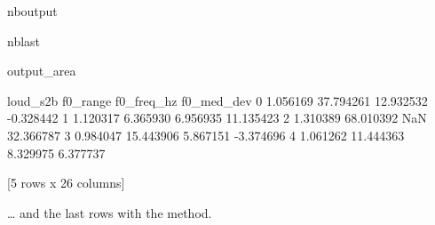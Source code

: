 \documentclass[letterpaper,10pt,english]{sphinxmanual}
\begin{document}
\begin{sphinxuseclass}{nboutput}
\begin{sphinxuseclass}{nblast}
{\begin{sphinxuseclass}{output_area}
\begin{sphinxuseclass}{}
\begin{sphinxVerbatim}[commandchars=\\\{\}]
   loud\_s2b   f0\_range  f0\_freq\_hz  f0\_med\_dev
0  1.056169  37.794261   12.932532   -0.328442
1  1.120317   6.365930    6.956935   11.135423
2  1.310389  68.010392         NaN   32.366787
3  0.984047  15.443906    5.867151   -3.374696
4  1.061262  11.444363    8.329975    6.377737

[5 rows x 26 columns]
\end{sphinxVerbatim}



\end{sphinxuseclass}
\end{sphinxuseclass}
}

\end{sphinxuseclass}
\end{sphinxuseclass}
\sphinxAtStartPar
… and the last rows with the  method.
\end{document}
